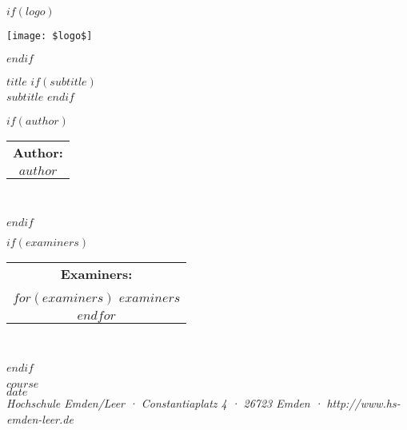 \begin{titlepage}

$if(logo)$
  \begin{center}
    \texttt{[image: \$logo\$]}
  \end{center}
$endif$


\vfill
\begin{center}
  \huge{$title$}
  $if(subtitle)$
    \\
    \LARGE{$subtitle$}
  $endif$
\end{center}
\vfill

$if(author)$
  \begin{center}
    \begin{tabular}{c}
        \large\textbf{{Author:}} \\[0.5cm]
        \large{$author$} \\
    \end{tabular}\\[1cm]
  \end{center}
$endif$

$if(examiners)$
  \begin{center}
    \begin{tabular}{c}
        \large\textbf{{Examiners:}} \\[0.5cm]
        $for(examiners)$
            \large{$examiners$} \\
        $endfor$
    \end{tabular}\\[2cm]
  \end{center}
$endif$

\begin{center}
  \large{$course$}\\
  \vspace{0.5cm}
  \large{$date$}\\
  \vspace{0.5cm}
  \textit{\footnotesize{Hochschule Emden/Leer · Constantiaplatz 4 · 26723 Emden · http://www.hs-emden-leer.de}}
\end{center}

\end{titlepage}